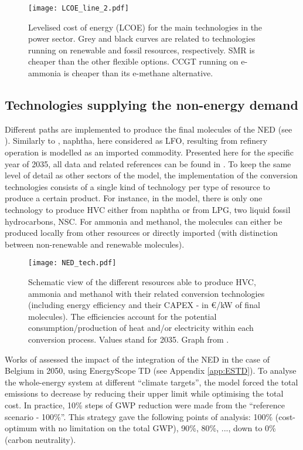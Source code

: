 \begin{figure}[htbp!]
\centering
\texttt{[image: LCOE\_line\_2.pdf]}
\caption{Levelised cost of energy (LCOE) for the main technologies in the power sector. Grey and black curves are related to technologies running on renewable and fossil resources, respectively. \gls{SMR} is cheaper than the other flexible options. \gls{CCGT} running on e-ammonia is cheaper than its e-methane alternative.}
\label{fig:LCOE}
\end{figure}

\subsection{Technologies supplying the non-energy demand}
\label{subsec:cs:NED_tech}

Different paths are implemented to produce the final molecules of the NED (see ). Similarly to \citet{tsiropoulos2018emerging}, naphtha, here considered as \gls{LFO}, resulting from refinery operation is modelled as an imported commodity. Presented here for the specific year of 2035, all data and related references can be found in \cite{GIT_NED}. To keep the same level of detail as other sectors of the model, the implementation of the conversion technologies consists of a single kind of technology per type of resource to produce a certain product. For instance, in the model, there is only one technology to produce \gls{HVC} either from naphtha or from LPG, two liquid fossil hydrocarbons, \ie \gls{NSC}. For ammonia and methanol, the molecules can either be produced locally from other resources or directly imported (with distinction between non-renewable and renewable molecules). 

\begin{figure}[htbp!]
\centering
\texttt{[image: NED\_tech.pdf]}
\caption{Schematic view of the different resources able to produce \gls{HVC}, ammonia and methanol with their related conversion technologies (including energy efficiency and their CAPEX - in €/kW of final molecules).  The efficiencies account for the potential consumption/production of heat and/or electricity within each conversion process. Values stand for 2035. Graph from \cite{rixhon2021comprehensive}.}
\label{fig:NED_tech}
\end{figure}
%

Works of \citet{rixhon2021comprehensive,rixhon2022integration} assessed the impact of the integration of the \gls{NED} in the case of Belgium in 2050, using EnergyScope TD (see Appendix \ref{app:ESTD}). To analyse the whole-energy system at different ``climate targets'', the model forced the total emissions to decrease by reducing their upper limit while optimising the total cost. In practice, 10\% steps of \gls{GWP} reduction were made from the ``reference scenario - 100\%''. This strategy gave the following points of analysis: 100\% (\ie cost-optimum with no limitation on the total \gls{GWP}), 90\%, 80\%, ..., down to 0\% (\ie  carbon neutrality).

